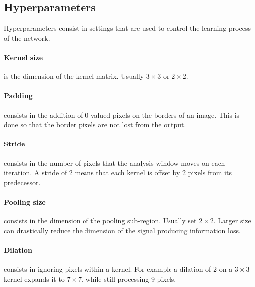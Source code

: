 \documentclass{standalone}
\begin{document}
\subsection{Hyperparameters}

Hyperparameters consist in settings that are used to control the learning process of the network.

\paragraph{Kernel size}
is the dimension of the kernel matrix. Usually $3\times3$ or $2\times2$.

\paragraph{Padding}
consists in the addition of  0-valued pixels on the borders of an image.
This is done so that the border pixels are not lost from the output.

\paragraph{Stride}
consists in the number of pixels that the analysis window moves on each iteration. 
A stride of 2 means that each kernel is offset by 2 pixels from its predecessor.

\paragraph{Pooling size}
consists in the dimension of the pooling sub-region. Usually set $2\times2$.
Larger size can drastically reduce the dimension of the signal producing information loss.

\paragraph{Dilation}
consists in ignoring pixels within a kernel.
For example a dilation of 2 on a $3\times3$ kernel expands it to $7\times7$, while still processing 9 pixels.
\end{document}
